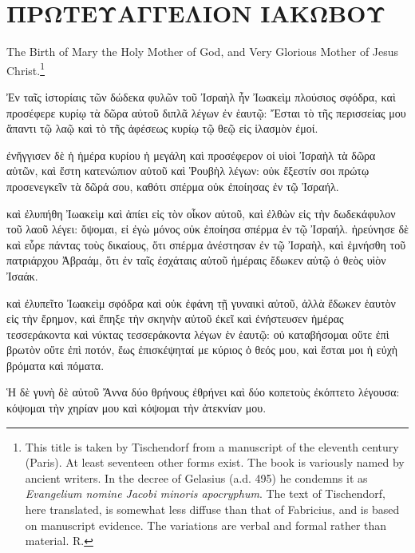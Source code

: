 \documentclass[12pt]{book} %
\begin{document}
\chapter*{ΠΡΩΤΕΥΑΓΓΕΛΙΟΝ ΙΑΚΩΒΟΥ}

The Birth of Mary the Holy Mother of God, and Very Glorious Mother of Jesus Christ.\footnote{This title is taken by Tischendorf from a manuscript of the eleventh century (Paris). At least seventeen other forms exist. The book is variously named by ancient writers. In the decree of Gelasius (a.d. 495) he condemns it as \textit{Evangelium nomine Jacobi minoris apocryphum}. The text of Tischendorf, here translated, is somewhat less diffuse than that of Fabricius, and is based on manuscript evidence. The variations are verbal and formal rather than material. R.}

\begin{pairs}
\begin{Leftside}\beginnumbering\pstart
{}

\pend\pstart
Ἐν ταῖς ἱστορίαις τῶν δώδεκα φυλῶν τοῦ Ἰσραὴλ ἦν Ἰωακεὶμ πλούσιος σφόδρα, καὶ προσέφερε κυρίῳ τὰ δῶρα αὐτοῦ διπλᾶ λέγων ἐν ἑαυτῷ: Ἔσται τὸ τῆς περισσείας μου ἅπαντι τῷ λαῷ καὶ τὸ τῆς ἀφέσεως κυρίῳ τῷ θεῷ εἰς ἱλασμὸν ἐμοί.

\pend\pstart
ἐνἤγγισεν δὲ ἡ ἡμέρα κυρίου ἡ μεγάλη καὶ προσέφερον οἱ υἱοὶ Ἰσραὴλ τὰ δῶρα αὐτῶν, καὶ ἔστη κατενώπιον αὐτοῦ καὶ Ῥουβὴλ λέγων: οὐκ ἔξεστίν σοι πρώτῳ προσενεγκεῖν τὰ δῶρά σου, καθότι σπέρμα οὐκ ἐποίησας ἐν τῷ Ἰσραήλ.

\pend\pstart
καὶ ἐλυπήθη Ἰωακεὶμ καὶ ἀπίει εἰς τὸν οἶκον αὐτοῦ, καὶ ἐλθὼν εἰς τὴν δωδεκάφυλον τοῦ λαοῦ λέγει: ὄψομαι, εἰ ἐγὼ μόνος οὐκ ἐποίησα σπέρμα ἐν τῷ Ἰσραήλ. ἠρεύνησε δὲ καὶ εὗρε πάντας τοὺς δικαίους, ὅτι σπέρμα ἀνέστησαν ἐν τῷ Ἰσραὴλ, καὶ ἐμνήσθη τοῦ πατριάρχου Ἀβραάμ, ὅτι ἐν ταῖς ἐσχάταις αὐτοῦ ἡμέραις ἔδωκεν αὐτῷ ὁ θεὸς υἱὸν Ἰσαάκ.

\pend\pstart
καὶ ἐλυπεῖτο Ἰωακεὶμ σφόδρα καὶ οὐκ ἐφάνη τῇ γυναικὶ αὐτοῦ, ἀλλὰ ἔδωκεν ἑαυτὸν εἰς τὴν ἔρημον, καὶ ἔπηξε τὴν σκηνὴν αὐτοῦ ἐκεῖ καὶ ἐνήστευσεν ἡμέρας τεσσεράκοντα καὶ νύκτας τεσσεράκοντα λέγων ἑν ἑαυτῷ: οὐ καταβήσομαι οὔτε ἐπὶ βρωτὸν οὔτε ἐπὶ ποτόν, ἕως ἐπισκέψηταί με κύριος ὁ θεός μου, καὶ ἔσται μοι ἡ εὐχὴ βρόματα καὶ πόματα.

\pend\pstart
{}

\pend\pstart
Ἡ δὲ γυνὴ δὲ αὐτοῦ Ἄννα δύο θρήνους ἐθρήνει καὶ δύο κοπετοὺς ἐκόπτετο λέγουσα: κόψομαι τὴν χηρίαν μου καὶ κόψομαι τὴν ἀτεκνίαν μου.


\end{Leftside}
\end{pairs}
\end{document}
